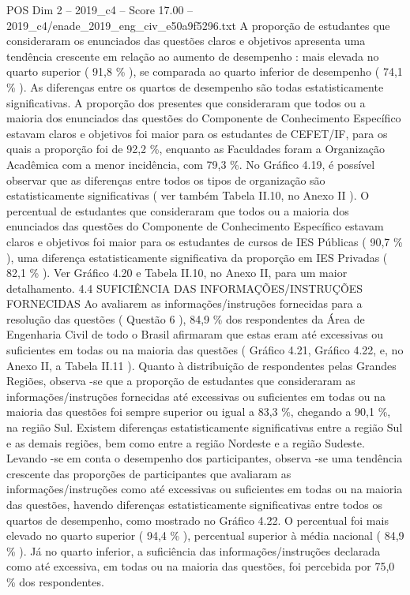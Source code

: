 \begin{textsample}{POS Dim 2 – 2019\_c4 – Score 17.00 – 2019\_c4/enade\_2019\_eng\_civ\_e50a9f5296.txt}
A proporção de estudantes que consideraram os enunciados das questões claros e objetivos apresenta uma tendência crescente em relação ao aumento de desempenho : mais elevada no quarto superior ( 91,8 \% ), se comparada ao quarto inferior de desempenho ( 74,1 \% ).
As diferenças entre os quartos de desempenho são todas estatisticamente significativas.
A proporção dos presentes que consideraram que todos ou a maioria dos enunciados das questões do Componente de Conhecimento Específico estavam claros e objetivos foi maior para os estudantes de CEFET/IF, para os quais a proporção foi de 92,2 \%, enquanto as Faculdades foram a Organização Acadêmica com a menor incidência, com 79,3 \%.
No Gráfico 4.19, é possível observar que as diferenças entre todos os tipos de organização são estatisticamente significativas ( ver também Tabela II.10, no Anexo II ).
O percentual de estudantes que consideraram que todos ou a maioria dos enunciados das questões do Componente de Conhecimento Específico estavam claros e objetivos foi maior para os estudantes de cursos de IES Públicas ( 90,7 \% ), uma diferença estatisticamente significativa da proporção em IES Privadas ( 82,1 \% ).
Ver Gráfico 4.20 e Tabela II.10, no Anexo II, para um maior detalhamento. 4.4 SUFICIÊNCIA DAS INFORMAÇÕES/INSTRUÇÕES FORNECIDAS Ao avaliarem as informações/instruções fornecidas para a resolução das questões ( Questão 6 ), 84,9 \% dos respondentes da Área de Engenharia Civil de todo o Brasil afirmaram que estas eram até excessivas ou suficientes em todas ou na maioria das questões ( Gráfico 4.21, Gráfico 4.22, e, no Anexo II, a Tabela II.11 ).
Quanto à distribuição de respondentes pelas Grandes Regiões, observa -se que a proporção de estudantes que consideraram as informações/instruções fornecidas até excessivas ou suficientes em todas ou na maioria das questões foi sempre superior ou igual a 83,3 \%, chegando a 90,1 \%, na região Sul.
Existem diferenças estatisticamente significativas entre a região Sul e as demais regiões, bem como entre a região Nordeste e a região Sudeste.
Levando -se em conta o desempenho dos participantes, observa -se uma tendência crescente das proporções de participantes que avaliaram as informações/instruções como até excessivas ou suficientes em todas ou na maioria das questões, havendo diferenças estatisticamente significativas entre todos os quartos de desempenho, como mostrado no Gráfico 4.22.
O percentual foi mais elevado no quarto superior ( 94,4 \% ), percentual superior à média nacional ( 84,9 \% ).
Já no quarto inferior, a suficiência das informações/instruções declarada como até excessiva, em todas ou na maioria das questões, foi percebida por 75,0 \% dos respondentes.

\end{textsample}
